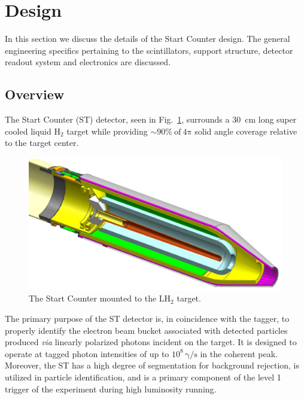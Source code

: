 \section{Design} \label{sec:design}

In this section we discuss the details of the \gx{} Start Counter design.  The general engineering specifics pertaining to the scintillators, support structure, detector readout system and electronics are discussed.

\subsection{Overview} \label{sec:design_overview}
The Start Counter (ST) detector, seen in Fig.~\ref{fig:sttargetiso}, surrounds a 30~cm long super cooled liquid $\mathrm{H_{2}}$ target while providing $\sim 90 \%\ \mathrm{of\ 4 \pi}$ solid angle coverage relative to the target center.
	\begin{figure}[!htb]
		\centering
		\includegraphics[width=1.0\columnwidth]{design/figs/st_target_iso}
		\caption{The \gx{} Start Counter mounted to the $\mathrm{LH_2}$ target.}
		\label{fig:sttargetiso}
	\end{figure}
The primary purpose of the ST detector is, in coincidence with the tagger, to properly identify the electron beam bucket associated with detected particles produced \textit{via} linearly polarized photons incident on the target. It is designed to operate at tagged photon intensities of up to $10^{8}\,\mathrm{\gamma/s}$ in the coherent peak.  Moreover, the ST has a high degree of segmentation for background rejection, is utilized in particle identification, and is a primary component of the level 1 trigger of the \gx{} experiment during high luminosity running\cite{pooser16}.

